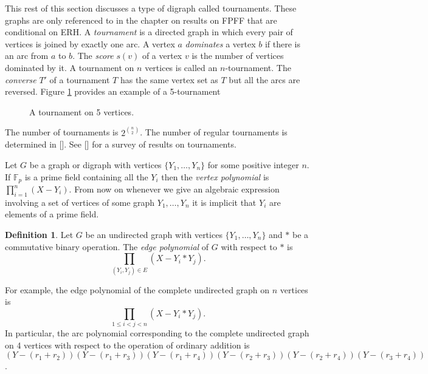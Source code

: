 \documentclass{article}
\newcounter{dummy} \numberwithin{dummy}{section}
\theoremstyle{plain}
\theoremstyle{definition}
\newtheorem{mydef}[dummy]{Definition}
\def\Fp {{ \mathbb{F} _ {p} }}
\begin{document}
				This rest of this section discusses a type of digraph called tournaments. These graphs are only referenced to in the chapter on results on FPFF that are conditional on ERH. A \emph{tournament} is a directed graph in which every pair of vertices is joined by exactly one arc. A vertex $a$ \emph{dominates} a vertex $b$ if there is an arc from $a$ to $b$. The \emph{score} $s(v)$ of a vertex $v$ is the number of vertices dominated by it. A tournament on $n$ vertices is called an $n$-tournament. The \emph{converse} $T'$ of a tournament $T$ has the same vertex set as $T$ but all the arcs are reversed. Figure \ref{FIG:tourn1} provides an example of a 5-tournament

        \begin{center}
        \begin{figure}  \caption{A tournament on 5 vertices.} \label{FIG:tourn1} \end{figure}
        \end{center}

        The number of tournaments is $2^{\binom{n}{2}}$. The number of regular tournaments is determined in []. See [] for a survey of results on tournaments. 

        Let $G$ be a graph or digraph with vertices $\{Y_1,\ldots,Y_n \}$ for some positive integer $n$. If $\Fp$ is a prime field containing all the $Y_i$ then the \emph{vertex polynomial} is $\prod_{i=1}^n{(X-Y_i)}$. From now on whenever we give an algebraic expression involving a set of vertices of some graph $Y_1,\ldots, Y_n$ it is implicit that $Y_i$ are elements of a prime field. 


				\begin{mydef}
				\label{DEF:edgepoly}
				    Let $G$ be an undirected graph with vertices $\{Y_1,\ldots,Y_n \}$ and $\ast$ be a commutative binary operation. The \emph{edge polynomial} of $G$ with respect to $\ast$ is 
            \[
                \prod_{(Y_i,Y_j) \in E}{(X-Y_i \ast Y_j)}.
            \]
        \end{mydef}
        
				\noindent For example, the edge polynomial of the complete undirected graph on $n$ vertices is \[ \prod_{1 \leq i<j<n}{(X-Y_i \ast Y_j)}. \]
        In particular, the arc polynomial corresponding to the complete undirected graph on 4 vertices with respect to the operation of ordinary addition is $(Y-(r_1+r_2))(Y-(r_1+r_3))(Y-(r_1+r_4))(Y-(r_2+r_3))(Y-(r_2+r_4))(Y-(r_3+r_4))$.
\end{document}

